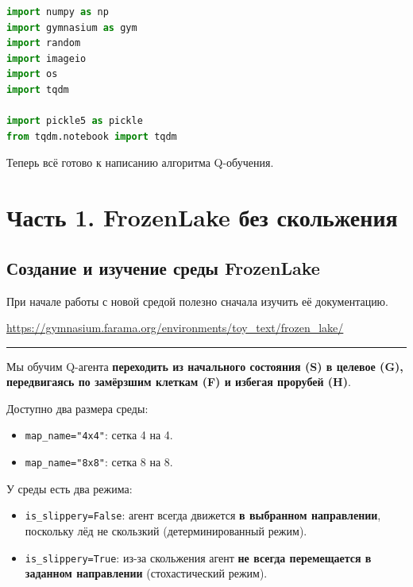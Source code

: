 \documentclass[11pt,a4paper]{article}
\begin{document}
\begin{lstlisting}[language=Python]
import numpy as np
import gymnasium as gym
import random
import imageio
import os
import tqdm

import pickle5 as pickle
from tqdm.notebook import tqdm
\end{lstlisting}

Теперь всё готово к написанию алгоритма Q-обучения.

\section{Часть 1. FrozenLake без скольжения}\label{part-1-frozen-lake-non-slippery-version}

\subsection{Создание и изучение среды FrozenLake}\label{create-and-understand-frozenlake-environment}

При начале работы с новой средой полезно сначала изучить её документацию.

\url{https://gymnasium.farama.org/environments/toy_text/frozen_lake/}

\begin{center}\rule{0.5\linewidth}{0.5pt}\end{center}

Мы обучим Q-агента \textbf{переходить из начального состояния (S) в целевое (G), передвигаясь по замёрзшим клеткам (F) и избегая прорубей (H)}.

Доступно два размера среды:

\begin{itemize}
\tightlist
\item
  \passthrough{\lstinline!map_name="4x4"!}: сетка 4 на 4.
\item
  \passthrough{\lstinline!map_name="8x8"!}: сетка 8 на 8.
\end{itemize}

У среды есть два режима:

\begin{itemize}
\tightlist
\item
  \passthrough{\lstinline!is_slippery=False!}: агент всегда движется \textbf{в выбранном направлении}, поскольку лёд не скользкий (детерминированный режим).
\item
  \passthrough{\lstinline!is_slippery=True!}: из-за скольжения агент \textbf{не всегда перемещается в заданном направлении} (стохастический режим).
\end{itemize}
\end{document}
